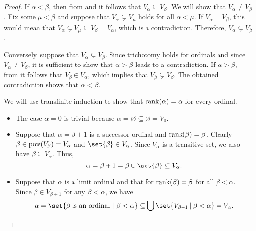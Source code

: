 \begin{proof}
   If \( \alpha < \beta \), then from  and  it follows that \( V_\alpha \subseteq V_\beta \). We will show that \( V_\alpha \neq V_\beta \). Fix some \( \mu < \beta \) and suppose that \( V_\alpha \subsetneq V_\mu \) holds for all \( \alpha < \mu \). If \( V_\alpha = V_\beta \), this would mean that \( V_\alpha \subsetneq V_\mu \subseteq V_\beta = V_\alpha \), which is a contradiction. Therefore, \( V_\alpha \subsetneq V_\beta \).

  Conversely, suppose that \( V_\alpha \subsetneq V_\beta \). Since trichotomy holds for ordinals and since \( V_\alpha \neq V_\beta \), it is sufficient to show that \( \alpha > \beta \) leads to a contradiction. If \( \alpha > \beta \), from  it follows that \( V_\beta \in V_\alpha \), which implies that \( V_\beta \subsetneq V_\beta \). The obtained contradiction shows that \( \alpha < \beta \).

   We will use transfinite induction to show that \( \operatorname{rank}(\alpha) = \alpha \) for every ordinal.
  \begin{itemize}
    \item The case \( \alpha = 0 \) is trivial because \( \alpha = \varnothing \subseteq \varnothing = V_0 \).

    \item Suppose that \( \alpha = \beta + 1 \) is a successor ordinal and \( \operatorname{rank}(\beta) = \beta \). Clearly \( \beta \in \operatorname{pow}(V_\beta) = V_\alpha \) and \( \set{ \beta } \in V_\alpha \). Since \( V_\alpha \) is a transitive set, we also have \( \beta \subseteq V_\alpha \). Thus,
    \begin{equation*}
      \alpha = \beta + 1 = \beta \cup \set{ \beta } \subseteq V_\alpha.
    \end{equation*}

    \item Suppose that \( \alpha \) is a limit ordinal and that for \( \operatorname{rank}(\beta) = \beta \) for all \( \beta < \alpha \). Since \( \beta \in V_{\beta + 1} \) for any \( \beta < \alpha \), we have
    \begin{equation*}
      \alpha
      =
      \set{ \beta \T{is an ordinal} \given \beta < \alpha }
      \subseteq
      \bigcup\set{ V_{\beta + 1} \given \beta < \alpha }
      =
      V_\alpha.
    \end{equation*}
  \end{itemize}


\end{proof}
